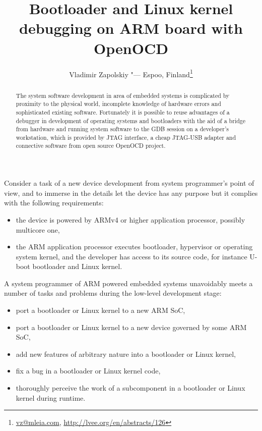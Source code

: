 \documentclass[10pt, a5paper]{article}
\begin{document}
\title{Bootloader and Linux kernel debugging on ARM board with OpenOCD}
\author{Vladimir Zapolskiy "--- Espoo, Finland\footnote{\url{vz@mleia.com}, \url{http://lvee.org/en/abstracts/126}}}
\maketitle
\begin{abstract}
The system software development in area of embedded systems is complicated by proximity to the physical world, incomplete knowledge of hardware errors and sophisticated existing software. Fortunately it is possible to reuse advantages of a debugger in development of operating systems and bootloaders with the aid of a bridge from hardware and running system software to the GDB session on a developer's workstation, which is provided by JTAG interface, a cheap JTAG-USB adapter and connective software from open source OpenOCD project.
\end{abstract}
Consider a task of a new device development from system programmer's point of view, and to immerse in the details let the device has any purpose but it complies with the following requirements:

\begin{itemize}
  \item the device is powered by ARMv4 or higher application processor, possibly multicore one,
  \item the ARM application processor executes bootloader, hypervisor or operating system kernel, and the developer has access to its source code, for instance U-boot bootloader and Linux kernel.
\end{itemize}

A system programmer of ARM powered embedded systems unavoidably meets a number of tasks and problems during the low-level development stage:

\begin{itemize}
  \item port a bootloader or Linux kernel to a new ARM SoC,
  \item port a bootloader or Linux kernel to a new device governed by some ARM SoC,
  \item add new features of arbitrary nature into a bootloader or Linux kernel,
  \item fix a bug in a bootloader or Linux kernel code,
  \item thoroughly perceive the work of a subcomponent in a bootloader or Linux kernel during runtime.
\end{itemize}
\end{document}

